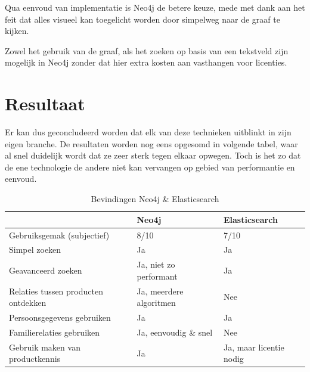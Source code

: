Qua eenvoud van implementatie is Neo4j de betere keuze, mede met dank aan het feit dat alles visueel kan toegelicht worden door simpelweg naar de graaf te kijken. 

Zowel het gebruik van de graaf, als het zoeken op basis van een tekstveld zijn mogelijk in Neo4j zonder dat hier extra kosten aan vasthangen voor licenties. 

\section{Resultaat}
\label{sec:Resultaat}

Er kan dus geconcludeerd worden dat elk van deze technieken uitblinkt in zijn eigen branche. De resultaten worden nog eens opgesomd in volgende tabel, waar al snel duidelijk wordt dat ze zeer sterk tegen elkaar opwegen. Toch is het zo dat de ene technologie de andere niet kan vervangen op gebied van performantie en eenvoud.

\begin{table}[hbt!]
	\begin{tabular}{l|l|l|}
		\cline{2-3}
		& \cellcolor[HTML]{C0C0C0}Neo4j & \cellcolor[HTML]{C0C0C0}Elasticsearch \\ \hline
		\multicolumn{1}{|l|}{\cellcolor[HTML]{EFEFEF}Gebruiksgemak (subjectief)}      & 8/10                          & 7/10                                  \\ \hline
		\multicolumn{1}{|l|}{\cellcolor[HTML]{EFEFEF}Simpel zoeken}                   & Ja                            & Ja                                    \\ \hline
		\multicolumn{1}{|l|}{\cellcolor[HTML]{EFEFEF}Geavanceerd zoeken}              & Ja, niet zo performant        & Ja                                    \\ \hline
		\multicolumn{1}{|l|}{\cellcolor[HTML]{EFEFEF}Relaties tussen producten ontdekken}              & Ja, meerdere algoritmen       & Nee                    \\ \hline
		\multicolumn{1}{|l|}{\cellcolor[HTML]{EFEFEF}Persoonsgegevens gebruiken}              & Ja    & Ja                    \\ \hline
		\multicolumn{1}{|l|}{\cellcolor[HTML]{EFEFEF}Familierelaties gebruiken}       & Ja, eenvoudig \& snel         & Nee          \\ \hline
		\multicolumn{1}{|l|}{\cellcolor[HTML]{EFEFEF}Gebruik maken van productkennis} & Ja                            & Ja, maar licentie nodig               \\ \hline
	\end{tabular}
	\caption{\label{tab: Bevindingen Neo4j & Elasticsearch} Bevindingen Neo4j \& Elasticsearch}
\end{table}




